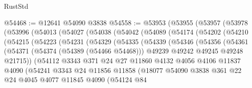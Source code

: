 \begin{lexlean}{RustStd}
\begin{coremodule}
@54468 := @12641 @54090 @3838
@54558 := @53953
    (@53955
      (@53957
        (@53978
          (@53996
            (@54013
              (@54027
                (@54038
                  (@54042
                    (@54089
                      (@54174
                        (@54202
                          (@54210
                            (@54215
                              (@54223
                                (@54231
                                  (@54329
                                    (@54335
                                      (@54339
                                        (@54346
                                          (@54356
                                            (@54361
                                              (@54371
                                                (@54374 (@54389 (@54466 @54468)))
                                                @49239
                                                @49242
                                                @49245
                                                @49248
                                                @21715))
                                            (@54112
                                              @3343
                                              @371
                                              @24
                                              @27
                                              @11860
                                              @4132
                                              @4056
                                              @4106
                                              @11837
                                              @4090
                                              (@54241
                                                @3343
                                                @24
                                                @11856
                                                @11858
                                                (@18077
                                                  @54090
                                                  @3838
                                                  @361
                                                  @22
                                                  @24
                                                  @4045
                                                  @4077
                                                  @11845
                                                  @4090
                                                  (@54124
                                                    @84

\end{coremodule}
\end{lexlean}
